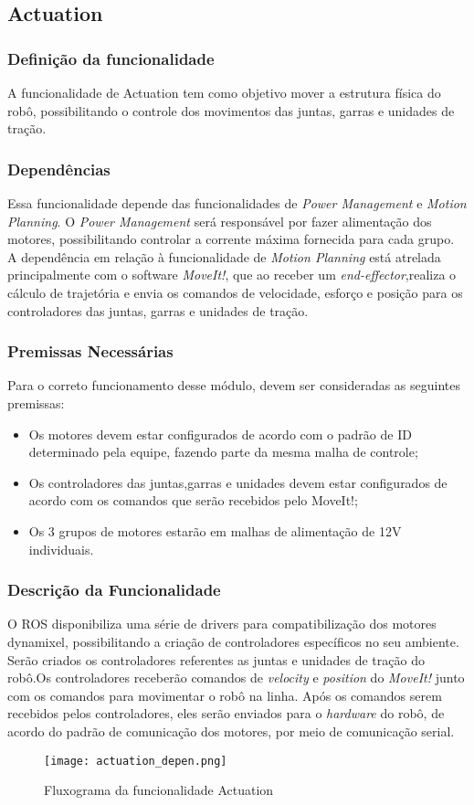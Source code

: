 \subsection{Actuation }
\label{ssec:actu}
\subsubsection{Definição da funcionalidade}
A funcionalidade de Actuation tem como objetivo mover a estrutura física do robô, possibilitando o controle dos movimentos das juntas, garras e unidades de tração.
\subsubsection{Dependências}
Essa funcionalidade depende das funcionalidades de \textit{Power Management} e \textit{Motion Planning}. O \textit{Power Management} será responsável por fazer alimentação dos motores, possibilitando controlar a corrente máxima fornecida para cada grupo.
A dependência em relação à funcionalidade de \textit{Motion Planning} está atrelada principalmente com o software \textit{MoveIt!}, que ao receber um \textit{end-effector},realiza o cálculo de trajetória e envia os comandos de velocidade, esforço e posição para os controladores das juntas, garras e unidades de tração.

\subsubsection{Premissas Necessárias}
Para o correto funcionamento desse módulo, devem ser consideradas as seguintes premissas:
\begin{itemize}
	\item Os motores devem estar configurados de acordo com o padrão de ID determinado pela equipe, fazendo parte da mesma malha de controle;
	\item Os controladores das juntas,garras e unidades devem estar configurados de acordo com os comandos que serão recebidos pelo MoveIt!;
	\item Os 3 grupos de motores estarão em malhas de alimentação de 12V individuais.
\end{itemize}
\subsubsection{Descrição da Funcionalidade}
O ROS disponibiliza uma série de drivers para compatibilização dos motores dynamixel, possibilitando a criação de controladores específicos no seu ambiente. Serão criados os controladores referentes as juntas e unidades de tração do robô.Os controladores receberão comandos de \textit{velocity} e \textit{position} do \textit{MoveIt!} junto com os comandos para movimentar o robô na linha.
Após os comandos serem recebidos pelos controladores, eles serão enviados para o \textit{hardware} do robô, de acordo do padrão de comunicação dos motores, por meio de comunicação serial. 
\begin{figure}[h]
	\centering
	\texttt{[image: actuation\_depen.png]}
	\caption{Fluxograma da funcionalidade Actuation}
	\label{fig:depen_actuation}
\end{figure}
